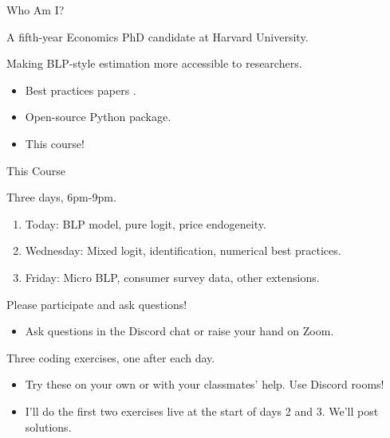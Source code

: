 \documentclass[aspectratio=169,t,11pt,table]{beamer}
\begin{document}

\begin{frame}{Who Am I?}
    \begin{wideitemize}
        \item A fifth-year Economics PhD candidate at Harvard University.
        \pause
        \item Making BLP-style estimation more accessible to researchers.
        \begin{itemize}
            \item Best practices papers \citep{conlon2020best,conlon2023incorporating}.
            \item Open-source Python package.
            \item This course!
        \end{itemize}
    \end{wideitemize}
\end{frame}

\begin{frame}{This Course}
    \begin{wideitemize}
        \item Three days, 6pm-9pm.
        \begin{enumerate}
            \item Today: BLP model, pure logit, price endogeneity.
            \item Wednesday: Mixed logit, identification, numerical best practices.
            \item Friday: Micro BLP, consumer survey data, other extensions.
        \end{enumerate}
        \pause
        \item Please participate and ask questions!
        \begin{itemize}
            \item Ask questions in the Discord chat or raise your hand on Zoom.
        \end{itemize}
        \pause
        \item Three coding exercises, one after each day.
        \begin{itemize}
            \item Try these on your own or with your classmates' help. Use Discord rooms!
            \item I'll do the first two exercises live at the start of days 2 and 3. We'll post solutions.
        \end{itemize}
    \end{wideitemize}
\end{frame}
\end{document}
